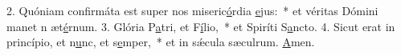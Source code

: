 2. Quóniam confirmáta est super nos miseric\uline{ó}rdia \uline{e}jus:~* et véritas Dómini manet n æt\uline{é}rnum.
3. Glória P\uline{a}tri, et F\uline{í}lio,~* et Spiríti S\uline{a}ncto.
4. Sicut erat in princípio, et n\uline{u}nc, et s\uline{e}mper,~* et in sǽcula sæculrum. \uline{A}men.
